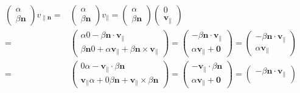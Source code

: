 \documentclass[
]{book}
\theoremstyle{definition}
\theoremstyle{definition}
\theoremstyle{definition}
\theoremstyle{definition}
\theoremstyle{remark}
\begin{document}
\[
\begin{aligned}
\begin{pmatrix}\alpha\\
\beta\boldsymbol{n}
\end{pmatrix}v_{{\scriptscriptstyle \parallel\boldsymbol{n}}}= & \begin{pmatrix}\alpha\\
\beta\boldsymbol{n}
\end{pmatrix}v_{{\scriptscriptstyle \parallel}}=\begin{pmatrix}\alpha\\
\beta\boldsymbol{n}
\end{pmatrix}\begin{pmatrix}0\\
\boldsymbol{v}_{{\scriptscriptstyle \parallel}}
\end{pmatrix}\\
= & \begin{pmatrix}\alpha0-\beta\boldsymbol{n}\cdot\boldsymbol{v}_{{\scriptscriptstyle \parallel}}\\
\beta\boldsymbol{n}0+\alpha\boldsymbol{v}_{{\scriptscriptstyle \parallel}}+\beta\boldsymbol{n}\times\boldsymbol{v}_{{\scriptscriptstyle \parallel}}
\end{pmatrix}=\begin{pmatrix}-\beta\boldsymbol{n}\cdot\boldsymbol{v}_{{\scriptscriptstyle \parallel}}\\
\alpha\boldsymbol{v}_{{\scriptscriptstyle \parallel}}+\boldsymbol{0}
\end{pmatrix}=\begin{pmatrix}-\beta\boldsymbol{n}\cdot\boldsymbol{v}_{{\scriptscriptstyle \parallel}}\\
\alpha\boldsymbol{v}_{{\scriptscriptstyle \parallel}}
\end{pmatrix}\\
= & \begin{pmatrix}0\alpha-\boldsymbol{v}_{{\scriptscriptstyle \parallel}}\cdot\beta\boldsymbol{n}\\
\boldsymbol{v}_{{\scriptscriptstyle \parallel}}\alpha+0\beta\boldsymbol{n}+\boldsymbol{v}_{{\scriptscriptstyle \parallel}}\times\beta\boldsymbol{n}
\end{pmatrix}=\begin{pmatrix}-\boldsymbol{v}_{{\scriptscriptstyle \parallel}}\cdot\beta\boldsymbol{n}\\
\alpha\boldsymbol{v}_{{\scriptscriptstyle \parallel}}+\boldsymbol{0}
\end{pmatrix}=\begin{pmatrix}-\beta\boldsymbol{n}\cdot\boldsymbol{v}_{{\scriptscriptstyle \parallel}}\\

\end{pmatrix}
\end{aligned}\]
\end{document}
